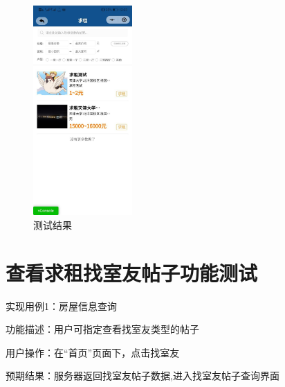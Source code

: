 \begin{figure}[htbp]
    \begin{minipage}[t]{0.32\textwidth}
    \centering
    \includegraphics[width=3.8cm,height=8cm]{test/image/test15.png}
    \caption{测试结果}
    \end{minipage}
    \end{figure}

\section{查看求租找室友帖子功能测试}
实现用例1：房屋信息查询

功能描述：用户可指定查看找室友类型的帖子

用户操作：在“首页”页面下，点击找室友

预期结果：服务器返回找室友帖子数据,进入找室友帖子查询界面

